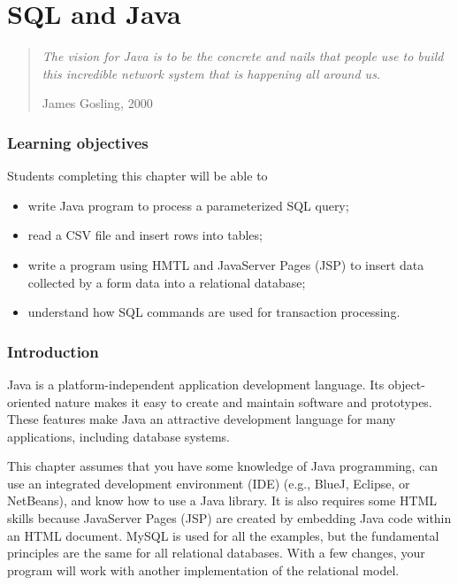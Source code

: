 \documentclass[
]{article}
\begin{document}
\hypertarget{sql-and-java}{%
\section{SQL and Java}\label{sql-and-java}}

\begin{quote}
\emph{The vision for Java is to be the concrete and nails that people use
to build this incredible network system that is happening all around
us.}

James Gosling, 2000
\end{quote}

\hypertarget{learning-objectives-13}{%
\subsubsection*{Learning objectives}\label{learning-objectives-13}}

Students completing this chapter will be able to

\begin{itemize}
\item
  write Java program to process a parameterized SQL query;
\item
  read a CSV file and insert rows into tables;
\item
  write a program using HMTL and JavaServer Pages (JSP) to insert data
  collected by a form data into a relational database;
\item
  understand how SQL commands are used for transaction processing.
\end{itemize}

\hypertarget{introduction-3}{%
\subsubsection*{Introduction}\label{introduction-3}}

Java is a platform-independent application development language. Its
object-oriented nature makes it easy to create and maintain software and
prototypes. These features make Java an attractive development language
for many applications, including database systems.

This chapter assumes that you have some knowledge of Java programming,
can use an integrated development environment (IDE) (e.g., BlueJ,
Eclipse, or NetBeans), and know how to use a Java library. It is also
requires some HTML skills because JavaServer Pages (JSP) are created by
embedding Java code within an HTML document. MySQL is used for all the
examples, but the fundamental principles are the same for all relational
databases. With a few changes, your program will work with another
implementation of the relational model.
\end{document}
